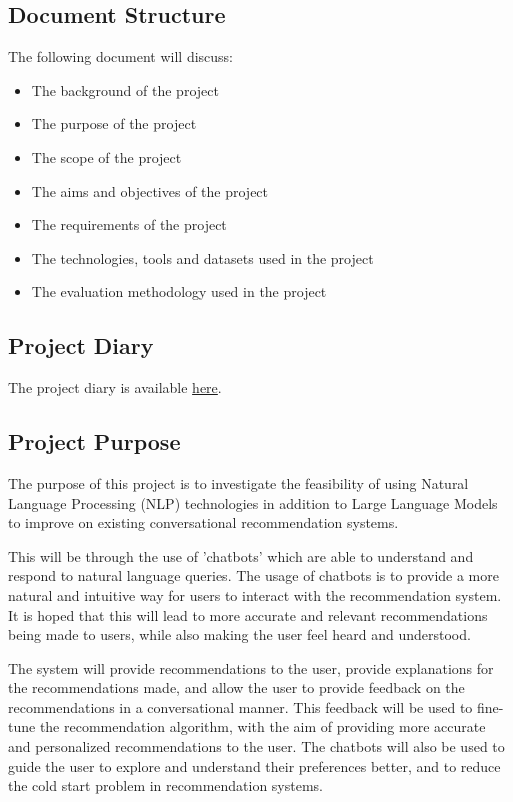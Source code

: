 
\subsection{Document Structure}
\label{sec:document_structure}
The following document will discuss:
\begin{itemize}
    \item The background of the project
    \item The purpose of the project
    \item The scope of the project
    \item The aims and objectives of the project
    \item The requirements of the project
    \item The technologies, tools and datasets used in the project
    \item The evaluation methodology used in the project
\end{itemize}

\subsection{Project Diary}
The project diary is available \href{https://drive.google.com/file/d/1xi0hksi-vjEgbcu-fukP462N1XLJZVuu/view?usp=sharing}{here}.

\subsection{Project Purpose}
\label{sec:project_purpose}

The purpose of this project is to investigate the feasibility of using Natural Language Processing (NLP) technologies in addition to Large Language Models to improve on existing conversational recommendation systems.

This will be through the use of 'chatbots' which are able to understand and respond to natural language queries. 
The usage of chatbots is to provide a more natural and intuitive way for users to interact with the recommendation system.
It is hoped that this will lead to more accurate and relevant recommendations being made to users, 
while also making the user feel heard and understood.

The system will provide recommendations to the user, provide explanations for the recommendations made, and allow the user to provide feedback on the recommendations in a conversational manner.
This feedback will be used to fine-tune the recommendation algorithm, with the aim of providing more accurate and personalized recommendations to the user.
The chatbots will also be used to guide the user to explore and understand their preferences better, and to reduce the cold start problem in recommendation systems.

